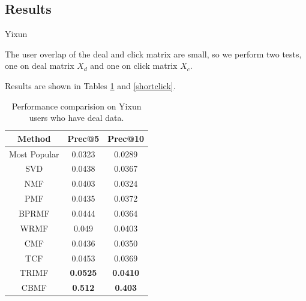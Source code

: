 \subsection{Results}
  \begin{subsubsection}{Yixun}
\par{The user overlap of the deal and click matrix are small, so we perform two tests, one on deal matrix $X_d$ and one on click matrix $X_c$.}
\par{Results are shown in Tables \ref{shortdeal} and \ref{shortclick}.}
\begin{table}


\begin{center}
  \begin{tabular}{|c|c|c|}
    \hline
    Method&Prec@5&Prec@10\\
    \hline
    Most Popular&0.0323&0.0289\\
    \hline
    SVD&0.0438&0.0367\\
    \hline
    NMF&0.0403&0.0324\\
    \hline
    PMF&0.0435&0.0372\\
    \hline
    BPRMF&0.0444&0.0364\\
    \hline
    WRMF&0.049&0.0403\\
    \hline
    CMF&0.0436&0.0350\\
    \hline
    TCF&0.0453&0.0369\\
    \hline
    TRIMF&\textbf{\color{red}0.0525}&\textbf{\color{red}0.0410}\\
    \hline
    CBMF&\textbf{0.512}&\textbf{0.403}\\
    \hline
  \end{tabular}
\end{center}
\caption{Performance comparision on Yixun users who have deal data.}
\label{shortdeal}

\end{table}

\begin{table}

  \centering



\end{table}
\end{subsubsection}
